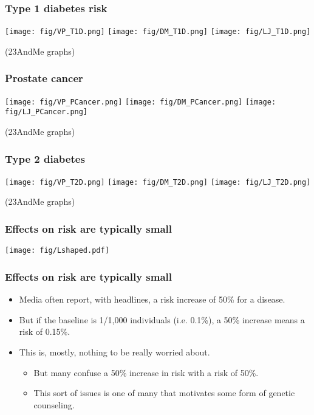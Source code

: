 \documentclass{beamer}
\begin{document}
\begin{frame}
  \frametitle{Type 1 diabetes risk}
  \begin{center}
    \texttt{[image: fig/VP\_T1D.png]}
    \texttt{[image: fig/DM\_T1D.png]}
    \texttt{[image: fig/LJ\_T1D.png]}
  \end{center}
  (23AndMe graphs)
\end{frame}



\begin{frame}
  \frametitle{Prostate cancer}
  \begin{center}
    \texttt{[image: fig/VP\_PCancer.png]}
    \texttt{[image: fig/DM\_PCancer.png]}
    \texttt{[image: fig/LJ\_PCancer.png]}
  \end{center}
  (23AndMe graphs)
\end{frame}



\begin{frame}
  \frametitle{Type 2 diabetes}
  \begin{center}
    \texttt{[image: fig/VP\_T2D.png]}
    \texttt{[image: fig/DM\_T2D.png]}
    \texttt{[image: fig/LJ\_T2D.png]}
  \end{center}
  (23AndMe graphs)
\end{frame}



\begin{frame}
  \frametitle{Effects on risk are typically small}
  \begin{center} 
    \texttt{[image: fig/Lshaped.pdf]}
  \end{center}
\end{frame}


\begin{frame}
  \frametitle{Effects on risk are typically small}
  \begin{itemize} 
    \item Media often report, with headlines, a risk increase of 50\% for a disease.
    \item But if the baseline is 1/1,000 individuals (i.e. 0.1\%), a 50\% increase means a risk of 0.15\%.
    \item This is, mostly, nothing to be really worried about.
      \begin{itemize}
      \item But many confuse a 50\% increase in risk with a risk of 50\%.
      \item This sort of issues is one of many that motivates some form of genetic counseling.
      \end{itemize}
  \end{itemize}
\end{frame}
\end{document}
